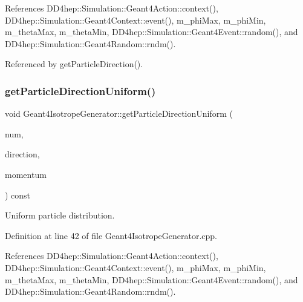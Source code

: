 References D\+D4hep\+::\+Simulation\+::\+Geant4\+Action\+::context(), D\+D4hep\+::\+Simulation\+::\+Geant4\+Context\+::event(), m\+\_\+phi\+Max, m\+\_\+phi\+Min, m\+\_\+theta\+Max, m\+\_\+theta\+Min, D\+D4hep\+::\+Simulation\+::\+Geant4\+Event\+::random(), and D\+D4hep\+::\+Simulation\+::\+Geant4\+Random\+::rndm().



Referenced by get\+Particle\+Direction().

\hypertarget{class_d_d4hep_1_1_simulation_1_1_geant4_isotrope_generator_a5f831997739d697b9d99920b74dcd1be}{}\label{class_d_d4hep_1_1_simulation_1_1_geant4_isotrope_generator_a5f831997739d697b9d99920b74dcd1be} 
\subsubsection{\texorpdfstring{get\+Particle\+Direction\+Uniform()}{getParticleDirectionUniform()}}
{\footnotesize\ttfamily void Geant4\+Isotrope\+Generator\+::get\+Particle\+Direction\+Uniform (\begin{DoxyParamCaption}\item[{int}]{num,  }\item[{R\+O\+O\+T\+::\+Math\+::\+X\+Y\+Z\+Vector \&}]{direction,  }\item[{double \&}]{momentum }\end{DoxyParamCaption}) const\hspace{0.3cm}{\ttfamily [protected]}}



Uniform particle distribution. 



Definition at line 42 of file Geant4\+Isotrope\+Generator.\+cpp.



References D\+D4hep\+::\+Simulation\+::\+Geant4\+Action\+::context(), D\+D4hep\+::\+Simulation\+::\+Geant4\+Context\+::event(), m\+\_\+phi\+Max, m\+\_\+phi\+Min, m\+\_\+theta\+Max, m\+\_\+theta\+Min, D\+D4hep\+::\+Simulation\+::\+Geant4\+Event\+::random(), and D\+D4hep\+::\+Simulation\+::\+Geant4\+Random\+::rndm().



